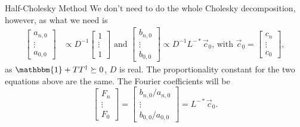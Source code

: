 \begin{frame}{Half-Cholesky Method}
    We don't need to do the whole Cholesky decomposition, however, as what we need is
    \begin{align}
        \left[\begin{matrix}
            a_{n,0} \\ \vdots \\ a_{0,0}
        \end{matrix}\right] &\propto D^{-1} \left[\begin{matrix}
            1 \\ \vdots \\ 1
        \end{matrix}\right] \text{ and }
        \left[\begin{matrix}
            b_{n,0} \\ \vdots \\ b_{0,0}
        \end{matrix}\right] \propto D^{-1}L^{-*} \vec{c}_0 \text{, with } \vec{c}_0 = \left[\begin{matrix}
            c_n \\ \vdots \\ c_0
        \end{matrix}\right],
    \end{align}
    as $\mathbbm{1}+TT^\dagger\succeq 0$, $D$ is real. The proportionality constant for the two equations above are the same. The Fourier coefficients will be
    \begin{equation}
        \left[\begin{matrix}
            F_n \\ \vdots \\ F_0
        \end{matrix}\right] = \left[\begin{matrix}
            b_{n,0}/a_{n,0} \\ \vdots \\ b_{0,0}/a_{0,0}
        \end{matrix}\right] = L^{-*} \vec{c}_0.
    \end{equation}
    
\end{frame}
